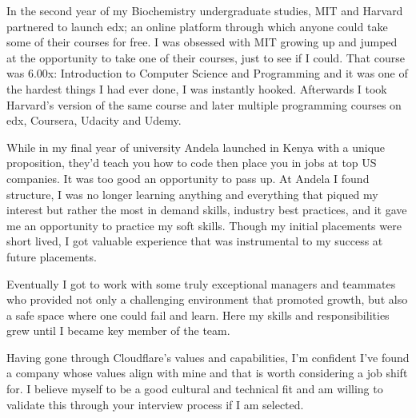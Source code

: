 \documentclass[11pt, a4paper]{awesome-cv}
\begin{document}
\makecvheader[R]

\makecvfooter
  {}
  {}
  {}

\makelettertitle

\begin{cvletter}

In the second year of my Biochemistry undergraduate studies, MIT and Harvard partnered to launch edx; an online platform through which anyone could take some of their courses for free. I was obsessed with MIT growing up and jumped at the opportunity to take one of their courses, just to see if I could. That course was 6.00x: Introduction to Computer Science and Programming and it was one of the hardest things I had ever done, I was instantly hooked. Afterwards I took Harvard's version of the same course and later multiple programming courses on edx, Coursera, Udacity and Udemy.

While in my final year of university Andela launched in Kenya with a unique proposition, they'd teach you how to code then place you in jobs at top US companies. It was too good an opportunity to pass up. At Andela I found structure, I was no longer learning anything and everything that piqued my interest but rather the most in demand skills, industry best practices, and it gave me an opportunity to practice my soft skills. Though my initial placements were short lived, I got valuable experience that was instrumental to my success at future placements.

Eventually I got to work with some truly exceptional managers and teammates who provided not only a challenging environment that promoted growth, but also a safe space where one could fail and learn. Here my skills and responsibilities grew until I became key member of the team.

Having gone through Cloudflare’s values and capabilities, I’m confident I’ve found a company whose values align with mine and that is worth considering a job shift for. I believe myself to be a good cultural and technical fit and am willing to validate this through your interview process if I am selected.

\end{cvletter}


\makeletterclosing
\end{document}
